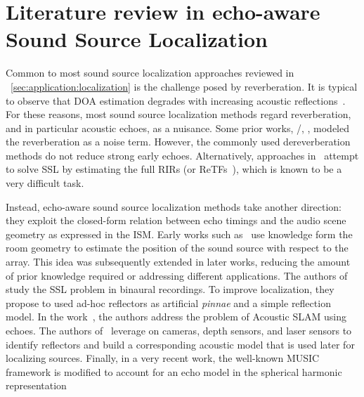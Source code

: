 

\section{Literature review in echo-aware Sound Source Localization}
Common to most sound source localization approaches reviewed in ~\cref{sec:application:localization} is the challenge posed by reverberation.
It is typical to observe that \acf{DOA} estimation degrades with increasing acoustic reflections~.
For these reasons, most sound source localization methods regard reverberation, and in particular acoustic echoes, as a nuisance.
Some prior works, \eg/, , modeled the reverberation as a noise term.
However, the commonly used dereverberation methods do not reduce strong early echoes.
Alternatively, approaches in~ attempt to solve \ac{SSL} by estimating the full \acp{RIR} (or \acp{ReTF}~), which is known to be a very difficult task.

\mynewline
Instead, echo-aware sound source localization methods take another direction:
they exploit the closed-form relation between echo timings and the audio scene geometry as expressed in the \acf{ISM}.
Early works such as~ use knowledge form the room geometry to estimate the position of the sound source with respect to the array.
This idea was subsequently extended in later works, reducing the amount of prior knowledge required or addressing different applications.
The authors of  study the \ac{SSL} problem in binaural recordings.
To improve localization, they propose to used ad-hoc reflectors as artificial \textit{pinnae} and a simple reflection model.
In the work~, the authors address the problem of Acoustic \ac{SLAM} using echoes.
The authors of~ leverage on cameras, depth sensors, and laser sensors to identify reflectors and build a corresponding acoustic model that is used later for localizing sources.
Finally, in a very recent work, the well-known \ac{MUSIC} framework is modified to account for an echo model in the spherical harmonic representation~

